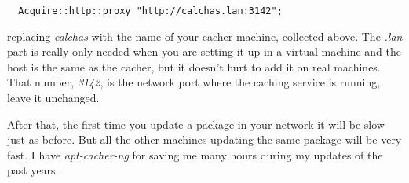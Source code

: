 \documentclass[12pt]{article}
\begin{document}
\begin{verbatim}
  Acquire::http::proxy "http://calchas.lan:3142";
\end{verbatim}

replacing \emph{calchas} with the name of your cacher machine, collected above.
The \emph{.lan} part is really only needed when you are setting it up in a
virtual machine and the host is the same as the cacher, but it doesn't hurt to
add it on real machines. That number, \emph{3142}, is the network port where
the caching service is running, leave it unchanged.

After that, the first time you update a package in your network it will be slow
just as before. But all the other machines updating the same package will be
very fast. I have \emph{apt-cacher-ng} for saving me many hours during my
updates of the past years.
\end{document}

